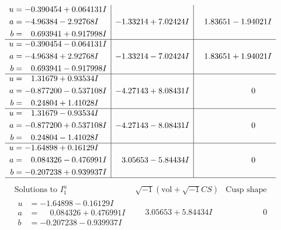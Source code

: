 \documentclass[1p]{elsarticle_modified}
\theoremstyle{definition}
\newcommand{\I}{\sqrt{-1}}
\begin{document}
$$\begin{array}{c|c|c}
\begin{aligned}
u &= -0.390454 + 0.064131 I \\
a &= -4.96384 - 2.92768 I \\
b &= \phantom{-}0.693941 + 0.917998 I\end{aligned}
 & -1.33214 + 7.02424 I & \phantom{-}1.83651 - 1.94021 I \\ \hline\begin{aligned}
u &= -0.390454 - 0.064131 I \\
a &= -4.96384 + 2.92768 I \\
b &= \phantom{-}0.693941 - 0.917998 I\end{aligned}
 & -1.33214 - 7.02424 I & \phantom{-}1.83651 + 1.94021 I \\ \hline\begin{aligned}
u &= \phantom{-}1.31679 + 0.93534 I \\
a &= -0.877200 - 0.537108 I \\
b &= \phantom{-}0.24804 + 1.41028 I\end{aligned}
 & -4.27143 + 8.08431 I & \phantom{-0.000000 } 0 \\ \hline\begin{aligned}
u &= \phantom{-}1.31679 - 0.93534 I \\
a &= -0.877200 + 0.537108 I \\
b &= \phantom{-}0.24804 - 1.41028 I\end{aligned}
 & -4.27143 - 8.08431 I & \phantom{-0.000000 } 0 \\ \hline\begin{aligned}
u &= -1.64898 + 0.16129 I \\
a &= \phantom{-}0.084326 - 0.476991 I \\
b &= -0.207238 + 0.939937 I\end{aligned}
 & \phantom{-}3.05653 - 5.84434 I & \phantom{-0.000000 } 0\\
 \hline 
 \end{array}$$\newpage$$\begin{array}{c|c|c}  
\text{Solutions to }I^u_{1}& \I (\text{vol} + \sqrt{-1}CS) & \text{Cusp shape}\\
 \hline 
\begin{aligned}
u &= -1.64898 - 0.16129 I \\
a &= \phantom{-}0.084326 + 0.476991 I \\
b &= -0.207238 - 0.939937 I\end{aligned}
 & \phantom{-}3.05653 + 5.84434 I & \phantom{-0.000000 } 0 \\ \hline\begin{aligned}

\end{aligned}
\end{array}$$
\end{document}
